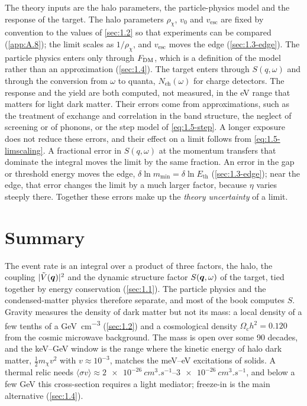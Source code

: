 The theory inputs are the halo parameters, the particle-physics model and the response of the target. The halo parameters $\rho_\chi$, $v_0$ and $v_{\mathrm{esc}}$ are fixed by convention to the values of \cref{sec:1.2} so that experiments can be compared (\cref{app:A.8}); the limit scales as $1/\rho_\chi$, and $v_{\mathrm{esc}}$ moves the edge (\cref{sec:1.3-edge}). The particle physics enters only through $F_{\mathrm{DM}}$, which is a definition of the model rather than an approximation (\cref{sec:1.4}). The target enters through $S(q,\omega)$ and through the conversion from $\omega$ to quanta, $N_{\mathrm{eh}}(\omega)$ for charge detectors. The response and the yield are both computed, not measured, in the eV range that matters for light dark matter. Their errors come from approximations, such as the treatment of exchange and correlation in the band structure, the neglect of screening or of phonons, or the step model of \cref{eq:1.5-step}. A longer exposure does not reduce these errors, and their effect on a limit follows from \cref{eq:1.5-limscaling}. A fractional error in $S(q,\omega)$ at the momentum transfers that dominate the integral moves the limit by the same fraction. An error in the gap or threshold energy moves the edge, $\delta\ln m_{\mathrm{min}} = \delta\ln E_{\mathrm{th}}$ (\cref{sec:1.3-edge}); near the edge, that error changes the limit by a much larger factor, because $\eta$ varies steeply there. Together these errors make up the \emph{theory uncertainty} of a limit.

\section*{Summary}

The event rate is an integral over a product of three factors, the halo, the coupling $|\tilde V(\bm{q})|^2$ and the dynamic structure factor $S(\bm{q},\omega)$ of the target, tied together by energy conservation (\cref{sec:1.1}). The particle physics and the condensed-matter physics therefore separate, and most of the book computes $S$. Gravity measures the density of dark matter but not its mass: a local density of a few tenths of a \si{GeV.cm^{-3}} (\cref{sec:1.2}) and a cosmological density $\Omega_{\mathrm{c}}h^2 = 0.120$ from the cosmic microwave background. The mass is open over some 90 decades, and the keV--GeV window is the range where the kinetic energy of halo dark matter, $\frac12 m_\chi v^2$ with $v \approx 10^{-3}$, matches the meV--eV excitations of solids. A thermal relic needs $\langle\sigma v\rangle \approx \SIrange{2e-26}{3e-26}{cm^3.s^{-1}}$, and below a few GeV this cross-section requires a light mediator; freeze-in is the main alternative (\cref{sec:1.4}).

